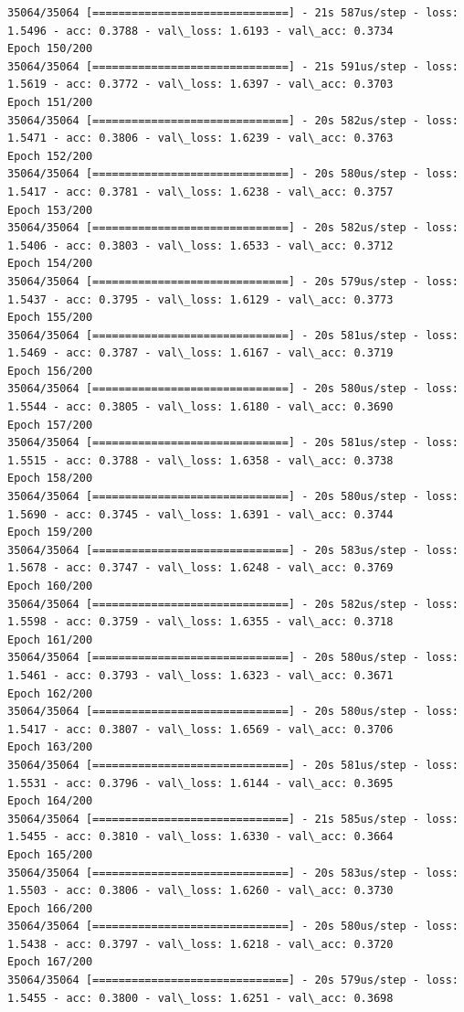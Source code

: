 \documentclass[11pt]{article}
\begin{document}
\begin{Verbatim}[commandchars=\\\{\}]
35064/35064 [==============================] - 21s 587us/step - loss: 1.5496 - acc: 0.3788 - val\_loss: 1.6193 - val\_acc: 0.3734
Epoch 150/200
35064/35064 [==============================] - 21s 591us/step - loss: 1.5619 - acc: 0.3772 - val\_loss: 1.6397 - val\_acc: 0.3703
Epoch 151/200
35064/35064 [==============================] - 20s 582us/step - loss: 1.5471 - acc: 0.3806 - val\_loss: 1.6239 - val\_acc: 0.3763
Epoch 152/200
35064/35064 [==============================] - 20s 580us/step - loss: 1.5417 - acc: 0.3781 - val\_loss: 1.6238 - val\_acc: 0.3757
Epoch 153/200
35064/35064 [==============================] - 20s 582us/step - loss: 1.5406 - acc: 0.3803 - val\_loss: 1.6533 - val\_acc: 0.3712
Epoch 154/200
35064/35064 [==============================] - 20s 579us/step - loss: 1.5437 - acc: 0.3795 - val\_loss: 1.6129 - val\_acc: 0.3773
Epoch 155/200
35064/35064 [==============================] - 20s 581us/step - loss: 1.5469 - acc: 0.3787 - val\_loss: 1.6167 - val\_acc: 0.3719
Epoch 156/200
35064/35064 [==============================] - 20s 580us/step - loss: 1.5544 - acc: 0.3805 - val\_loss: 1.6180 - val\_acc: 0.3690
Epoch 157/200
35064/35064 [==============================] - 20s 581us/step - loss: 1.5515 - acc: 0.3788 - val\_loss: 1.6358 - val\_acc: 0.3738
Epoch 158/200
35064/35064 [==============================] - 20s 580us/step - loss: 1.5690 - acc: 0.3745 - val\_loss: 1.6391 - val\_acc: 0.3744
Epoch 159/200
35064/35064 [==============================] - 20s 583us/step - loss: 1.5678 - acc: 0.3747 - val\_loss: 1.6248 - val\_acc: 0.3769
Epoch 160/200
35064/35064 [==============================] - 20s 582us/step - loss: 1.5598 - acc: 0.3759 - val\_loss: 1.6355 - val\_acc: 0.3718
Epoch 161/200
35064/35064 [==============================] - 20s 580us/step - loss: 1.5461 - acc: 0.3793 - val\_loss: 1.6323 - val\_acc: 0.3671
Epoch 162/200
35064/35064 [==============================] - 20s 580us/step - loss: 1.5417 - acc: 0.3807 - val\_loss: 1.6569 - val\_acc: 0.3706
Epoch 163/200
35064/35064 [==============================] - 20s 581us/step - loss: 1.5531 - acc: 0.3796 - val\_loss: 1.6144 - val\_acc: 0.3695
Epoch 164/200
35064/35064 [==============================] - 21s 585us/step - loss: 1.5455 - acc: 0.3810 - val\_loss: 1.6330 - val\_acc: 0.3664
Epoch 165/200
35064/35064 [==============================] - 20s 583us/step - loss: 1.5503 - acc: 0.3806 - val\_loss: 1.6260 - val\_acc: 0.3730
Epoch 166/200
35064/35064 [==============================] - 20s 580us/step - loss: 1.5438 - acc: 0.3797 - val\_loss: 1.6218 - val\_acc: 0.3720
Epoch 167/200
35064/35064 [==============================] - 20s 579us/step - loss: 1.5455 - acc: 0.3800 - val\_loss: 1.6251 - val\_acc: 0.3698

\end{Verbatim}
\end{document}
